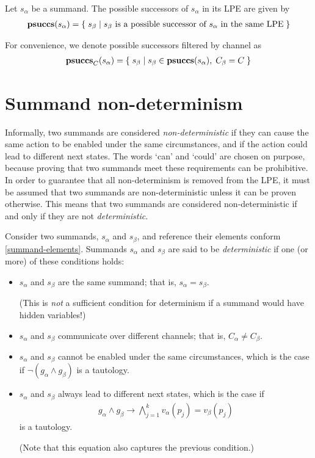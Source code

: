 Let $s_\alpha$ be a summand.
The possible successors of $s_\alpha$ in its LPE are given by
\begin{align*}
\mathbf{psuccs}(s_\alpha) = \{\;s_\beta\;|\;\text{$s_\beta$ is a possible successor of $s_\alpha$ in the same LPE}\;\}
\end{align*}

For convenience, we denote possible successors filtered by channel as
\begin{align*}
\mathbf{psuccs}_{C}(s_\alpha) = \{\;s_\beta\;|\;s_\beta \in \mathbf{psuccs}(s_\alpha),\; C_\beta = C\;\}
\end{align*}

\section{Summand non-determinism}

Informally, two summands are considered \emph{non-deterministic} if they can cause the same action to be enabled under the same circumstances, and if the action could lead to different next states.
The words `can' and `could' are chosen on purpose, because proving that two summands meet these requirements can be prohibitive.
In order to guarantee that all non-determinism is removed from the LPE, it must be assumed that two summands are non-deterministic unless it can be proven otherwise.
This means that two summands are considered non-deterministic if and only if they are not \emph{deterministic}.

Consider two summands, $s_\alpha$ and $s_\beta$, and reference their elements conform \ref{summand-elements}.
Summands $s_\alpha$ and $s_\beta$ are said to be \emph{deterministic} if one (or more) of these conditions holds:

\begin{itemize}
\item $s_\alpha$ and $s_\beta$ are the same summand; that is, $s_\alpha = s_\beta$.

(This is \emph{not} a sufficient condition for determinism if a summand would have hidden variables!)

\item $s_\alpha$ and $s_\beta$ communicate over different channels; that is, $C_\alpha \neq C_\beta$.

\item $s_\alpha$ and $s_\beta$ cannot be enabled under the same circumstances, which is the case if $\neg (g_\alpha \land g_\beta)$ is a tautology.

\item $s_\alpha$ and $s_\beta$ always lead to different next states, which is the case if
\begin{align*}
g_\alpha \land g_\beta \rightarrow \bigwedge\limits_{j=1}^{k} v_\alpha(p_j) = v_\beta(p_j)
\end{align*}
is a tautology.

(Note that this equation also captures the previous condition.)
\end{itemize}

